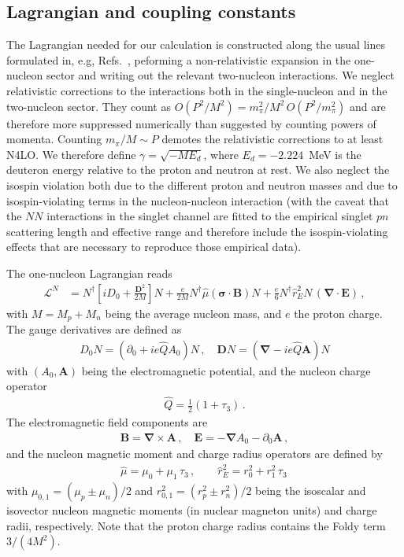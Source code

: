 \documentclass[prl,
twocolumn,
showpacs,preprintnumbers,amsmath,amssymb,
superscriptaddress,
a4paper,nofootinbib,longbibliography]{revtex4-2}
\def\bv#1{\boldsymbol{#1}}
\begin{document}
\subsection{Lagrangian and coupling constants}
The Lagrangian needed for our calculation is constructed along the usual lines formulated in, e.g, Refs.~\cite{Chen:1999tn,Kaplan:1996xu,Kaplan:1998we,Kaplan:1998tg,Chen:1999bg,Rupak:1999rk,Phillips:1999hh}, peforming a non-relativistic expansion in the one-nucleon sector and writing out the relevant two-nucleon interactions. We neglect relativistic corrections to the interactions both in the single-nucleon and in the two-nucleon sector. They count as $O(P^2/M^2)= m_\pi^2/M^2\,O(P^2/m_\pi^2)$ and are therefore more suppressed numerically than suggested by counting powers of momenta. Counting $m_\pi/M\sim P$ demotes the relativistic corrections to at least N4LO. We therefore define $\gamma=\sqrt{-M E_d}$, where $E_d=-2.224$~MeV is the deuteron energy relative to the proton and neutron at rest. We also neglect the isospin violation both due to the different proton and neutron masses and due to isospin-violating terms in the nucleon-nucleon interaction (with the caveat that the $NN$ interactions in the singlet channel are fitted to the empirical singlet $pn$ scattering length and effective range and therefore include the isospin-violating effects that are necessary to reproduce those empirical data).

 The one-nucleon Lagrangian reads
\begin{align}
\mathcal{L}^{N}&= N^\dagger\left[iD_0+\frac{\bv{D}^2}{2M}\right]N
+ \frac{e}{2M} N^\dagger \hat\mu\left(\bv\sigma\cdot\bv B \right)N + \frac{e}{6} N^\dagger\hat{r}_E^2 N\,\left(\bv{\nabla}\cdot\bv{E}\right)\,,
\label{eq:LagN}
\end{align}
with $M=M_p+M_n$ being the average nucleon mass, and $e$ the proton charge. The gauge derivatives are defined as
\begin{align}
D_0 N = \left(\partial_0 + i e \hat{Q} A_0\right) N\,,\quad \bv{D} N = \left(\bv{\nabla}-ie\hat{Q}\bv{A}\right)N
\end{align}
with $(A_0,\bv{A})$ being the electromagnetic potential, and the nucleon charge operator
\begin{align}
\hat{Q} =\frac{1}{2}(1+\tau_3)\,.
\end{align}
The electromagnetic field components are 
\begin{align}
    \bv{B} = \bv{\nabla}\times\bv{A}\,,\quad \bv{E}=-\bv{\nabla} A_0 -\partial_0\bv{A}\,,
\end{align}
and the nucleon magnetic moment and charge radius operators are defined by
\begin{align}
\hat{\mu} = \mu_0+\mu_1\,\tau_3 \,, \qquad \hat{r}^2_E= r_0^2 + r_1^2\,\tau_3\,
\end{align}
with $\mu_{0,1}=(\mu_p\pm \mu_n)/2$ and $r^2_{0,1}=(r_p^2\pm r_n^2)/2$ being the isoscalar and isovector nucleon magnetic moments (in nuclear magneton units) and charge radii, respectively.
Note that the proton charge radius contains the Foldy term $3/(4M^2)$.
\end{document}
